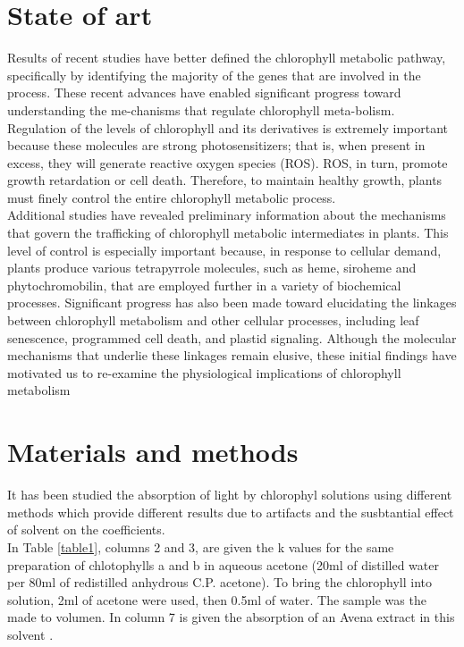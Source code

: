 \documentclass[a4paper, twocolumn, 11pt]{article}
\begin{document}
\section{State of art}
	Results of recent studies have better defined the chlorophyll metabolic pathway,\\ specifically by identifying the majority of the genes that are involved in the process. These recent advances have enabled significant progress toward understanding the me-chanisms that regulate chlorophyll meta-bolism. Regulation of the levels of chlorophyll and its derivatives is extremely important because these molecules are strong photosensitizers; that is, when present in excess, they will generate reactive oxygen species (ROS). ROS, in turn, promote\\ growth retardation or cell death. Therefore, to maintain healthy growth, plants must finely control the entire chlorophyll metabolic process.\\
	
	Additional studies have revealed preliminary information about the mechanisms that govern the trafficking of chlorophyll metabolic intermediates in plants. This level of control is especially important because, in response to cellular demand, plants produce various tetrapyrrole molecules, such as heme, siroheme and phytochromobilin, that are employed further in a variety of biochemical processes. Significant progress has also been made toward elucidating the linkages between chlorophyll metabolism and other cellular processes, including leaf senescence, programmed cell death, and plastid signaling. Although the molecular mechanisms that underlie these linkages remain elusive, these initial findings have motivated us to re-examine the physiological implications of chlorophyll metabolism \cite{Tanaka2006}

\section{Materials and methods}
	It has been studied the absorption of light by chlorophyl solutions using different methods which provide different results due to artifacts and the susbtantial effect of solvent on the coefficients. \\
	
	In Table \ref{table1}, columns 2 and 3, are given the k values for the same preparation of chlotophylls a and b in aqueous acetone (20ml of distilled water per 80ml of redistilled anhydrous C.P. acetone). To bring the chlorophyll into solution, 2ml of acetone were used, then 0.5ml of water. The sample was the made to volumen. In column 7 is given the absorption of an Avena extract in this solvent \cite{Mackinney}.\\
	
\end{document}
